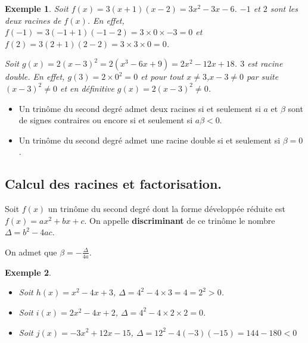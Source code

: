 \documentclass[a4paper,11pt]{article}
\theoremstyle{break}
\newtheorem{Ex}{Exemple}
\begin{document}
  \begin{Ex}
    Soit $f(x)=3(x+1)(x-2)=3x^2-3x-6$. $-1$ et $2$ sont les deux racines de $f(x)$.\newline
    En effet, $f(-1)=3(-1+1)(-1-2)=3\times0 \times -3=0$ et $f(2)=3(2+1)(2-2)=3 \times 3 \times 0=0$.
    
    Soit $g(x)=2(x-3)^2=2(x^3-6x+9)=2x^2-12x+18$. $3$ est racine double. 
    En effet, $g(3)=2\times 0^2=0$ et pour tout $x \neq 3$,$x-3\neq0$ par suite 
    $(x-3)^2 \neq 0$ et en définitive $g(x)=2(x-3)^2 \neq 0$. 
  \end{Ex}
  
  \begin{Prop}
    \begin{itemize}
     \item Un trinôme du second degré admet deux racines si et seulement si $a$ et $\beta$
   sont de signes contraires ou encore si et seulement si $a\beta<0$.
     \item Un trinôme du second degré admet une racine double si et seulement si
     $\beta=0$.
    \end{itemize}
  \end{Prop}
  
  \subsection{Calcul des racines et factorisation.}
  
  \begin{Def}[Discriminant]
    Soit $f(x)$ un trinôme du second degré dont la forme développée réduite
    est $f(x)=ax^2+bx+c$. On appelle \textbf{discriminant} de ce trinôme
    le nombre $\Delta=b^2-4ac$.
    
    On admet que $\beta=-\frac{\Delta}{4a}$.
  \end{Def}
  
  \begin{Ex}
    \begin{itemize}
     \item Soit $h(x)=x^2-4x+3$, $\Delta=4^2-4 \times 3=4=2^2>0$.
     \item Soit $i(x)=2x^2-4x+2$, $\Delta=4^2-4 \times 2 \times 2=0$.
     \item Soit $j(x)=-3x^2+12x-15$, $\Delta=12^2-4(-3)(-15)=144-180<0$
    \end{itemize}
   \end{Ex}
  
\end{document}
